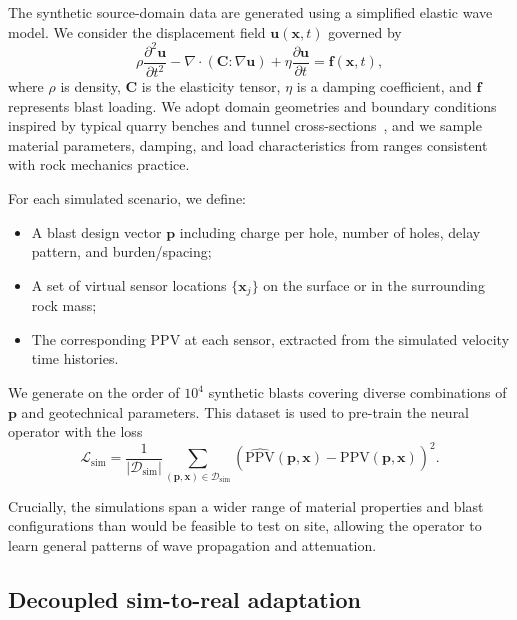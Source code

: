 \documentclass[a4paper,fleqn]{cas-sc}
\begin{document}
The synthetic source-domain data are generated using a simplified elastic wave model.
We consider the displacement field $\mathbf{u}(\mathbf{x},t)$ governed by
\begin{equation}
    \rho \frac{\partial^2 \mathbf{u}}{\partial t^2}
    - \nabla \cdot \left( \mathbf{C} : \nabla \mathbf{u} \right)
    + \eta \frac{\partial \mathbf{u}}{\partial t}
    = \mathbf{f}(\mathbf{x},t),
    \label{eq:wave}
\end{equation}
where $\rho$ is density, $\mathbf{C}$ is the elasticity tensor,
$\eta$ is a damping coefficient, and $\mathbf{f}$ represents blast loading.
We adopt domain geometries and boundary conditions inspired by typical quarry benches
and tunnel cross-sections~\citep{Zorzal2022FEM},
and we sample material parameters, damping, and load characteristics
from ranges consistent with rock mechanics practice.

For each simulated scenario, we define:
\begin{itemize}
  \item A blast design vector $\mathbf{p}$ including charge per hole, number of holes, delay pattern, and burden/spacing;
  \item A set of virtual sensor locations $\{\mathbf{x}_j\}$ on the surface or in the surrounding rock mass;
  \item The corresponding PPV at each sensor, extracted from the simulated velocity time histories.
\end{itemize}
We generate on the order of $10^4$ synthetic blasts covering diverse combinations of $\mathbf{p}$ and geotechnical parameters.
This dataset is used to pre-train the neural operator with the loss
\begin{equation}
    \mathcal{L}_\mathrm{sim}
    = \frac{1}{|\mathcal{D}_\mathrm{sim}|}
      \sum_{(\mathbf{p},\mathbf{x}) \in \mathcal{D}_\mathrm{sim}}
      \left( \hat{\mathrm{PPV}}(\mathbf{p},\mathbf{x}) - \mathrm{PPV}(\mathbf{p},\mathbf{x}) \right)^2.
\end{equation}

Crucially, the simulations span a wider range of material properties and blast configurations
than would be feasible to test on site,
allowing the operator to learn general patterns of wave propagation and attenuation.

\subsection{Decoupled sim-to-real adaptation}
\end{document}
